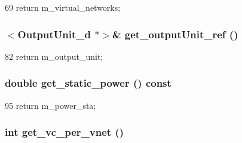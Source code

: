 \begin{DoxyCode}
69 { return m_virtual_networks; }
\end{DoxyCode}
\hypertarget{classRouter__d_a737bc5fa95d99d9a654ea112fdb0d556}{
\subsubsection[{get\_\-outputUnit\_\-ref}]{$<${\bf OutputUnit\_\-d} $\ast$$>$\& get\_\-outputUnit\_\-ref ()}}
\label{classRouter__d_a737bc5fa95d99d9a654ea112fdb0d556}



\begin{DoxyCode}
82 { return m_output_unit; }
\end{DoxyCode}
\hypertarget{classRouter__d_aeb5933543cfdeb1668baed5ce7c68351}{
\subsubsection[{get\_\-static\_\-power}]{\setlength{\rightskip}{0pt plus 5cm}double get\_\-static\_\-power () const}}
\label{classRouter__d_aeb5933543cfdeb1668baed5ce7c68351}



\begin{DoxyCode}
95 { return m_power_sta; }
\end{DoxyCode}
\hypertarget{classRouter__d_a048fe7d39416d6c11be1bd4ae1f70c13}{
\subsubsection[{get\_\-vc\_\-per\_\-vnet}]{\setlength{\rightskip}{0pt plus 5cm}int get\_\-vc\_\-per\_\-vnet ()}}
\label{classRouter__d_a048fe7d39416d6c11be1bd4ae1f70c13}



